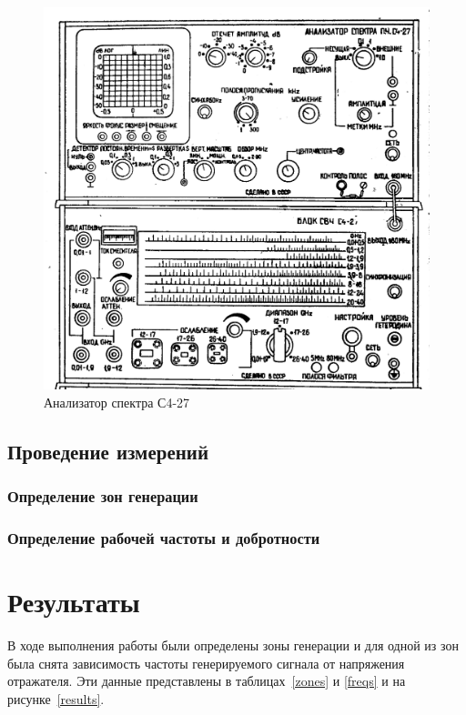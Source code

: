 \documentclass[a4paper,14pt]{extarticle}
\begin{document}
	\begin{figure}[h]
		\center
		\includegraphics[width = \textwidth]{images/s4-27.png}
		\caption{Анализатор спектра С4-27}
		\label{figa}
	\end{figure}

	\subsection{Проведение измерений}
	\subsubsection{Определение зон генерации}

	\subsubsection{Определение рабочей частоты и добротности}
    \section{Результаты}

    В ходе выполнения работы были определены зоны генерации и для одной из зон была снята зависимость частоты генерируемого сигнала от напряжения отражателя. Эти данные представлены в таблицах~\ref{zones} и \ref{freqs} и на рисунке~\ref{results}.
\end{document}
